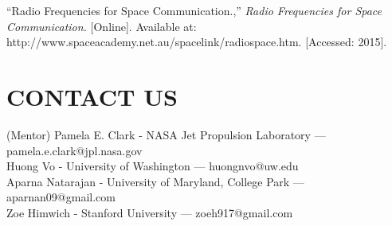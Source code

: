 \documentclass[a4, 12 pt]{article} %
\begin{document}
\noindent [6] ``Radio Frequencies for Space Communication.,'' \textit{Radio Frequencies for Space Communication.} [Online]. Available at: http://www.spaceacademy.net.au/spacelink/radiospace.htm. [Accessed: 2015].\\[2mm]
\section{CONTACT US}
(Mentor) Pamela E. Clark - NASA Jet Propulsion Laboratory --- pamela.e.clark@jpl.nasa.gov\\[3mm]
Huong Vo - University of Washington --- huongnvo@uw.edu \\[3mm]
Aparna Natarajan - University of Maryland, College Park --- aparnan09@gmail.com\\[3mm]
Zoe Himwich - Stanford University --- zoeh917@gmail.com
\end{document}
